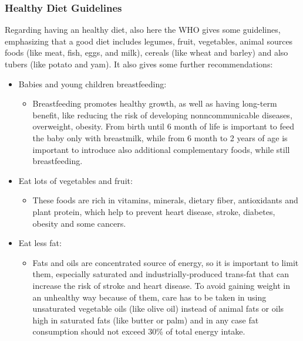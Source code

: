 \subsubsection{Healthy Diet Guidelines}
Regarding having an healthy diet, also here the WHO gives some guidelines, emphasizing that a good diet includes legumes, fruit, vegetables, animal sources foods (like meat, fish, eggs, and milk), cereals (like wheat and barley) and also tubers (like potato and yam). It also gives some further recommendations\cite{WhoHealthyDietGuidelines}: 
\vspace{3ex}
\begin{itemize}[nosep] %
    \item Babies and young children breastfeeding:\vspace{2ex}
          \begin{itemize}[nosep]
              \item Breastfeeding promotes healthy growth, as well as having long-term benefit, like reducing the risk of developing nonncommunicable diseases, overweight, obesity. From birth until 6 month of life is important to feed the baby only with breastmilk, while from 6 month to 2 years of age is important to introduce also additional complementary foods, while still breastfeeding.
          \end{itemize}
          \vspace{3ex}
    \item Eat lots of vegetables and fruit:\vspace{2ex}
          \begin{itemize}[nosep]
              \item These foods are rich in vitamins, minerals, dietary fiber, antioxidants and plant protein, which help to prevent heart disease, stroke, diabetes, obesity and some cancers.
          \end{itemize}
          \vspace{3ex}
    \item Eat less fat:\vspace{2ex}
          \begin{itemize}[nosep]
              \item Fats and oils are concentrated source of energy, so it is important to limit them, especially saturated and industrially-produced trans-fat that can increase the risk of stroke and heart disease. To avoid gaining weight in an unhealthy way because of them, care has to be taken in using unsaturated vegetable oils (like olive oil) instead of animal fats or oils high in saturated fats (like butter or palm) and in any case fat consumption should not exceed 30\% of total energy intake.

\end{itemize}
\end{itemize}
